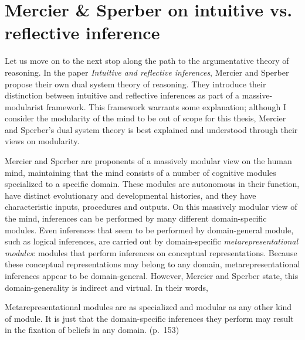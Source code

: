 
\section{Mercier \& Sperber on intuitive vs. reflective inference}
\label{sec:MS09}


Let us move on to the next stop along the path to the argumentative theory of reasoning. In the \citeyear{MS09} paper \emph{Intuitive and reflective inferences}, Mercier and Sperber propose their own dual system theory of reasoning. They introduce their distinction between intuitive and reflective inferences as part of a massive-modularist framework. This framework warrants some explanation; although I consider the modularity of the mind to be out of scope for this thesis, Mercier and Sperber's dual system theory is best explained and understood through their views on modularity.

Mercier and Sperber are proponents of a massively modular view on the human mind, maintaining that the mind consists of a number of cognitive modules specialized to a specific domain. These modules are autonomous in their function, have distinct evolutionary and developmental histories, and they have characteristic inputs, procedures and outputs.
On this massively modular view of the mind, inferences can be performed by many different domain-specific modules. Even inferences that seem to be performed by domain-general module, such as logical inferences, are carried out by domain-specific \emph{metarepresentational modules}: modules that perform inferences on conceptual representations.
Because these conceptual representations may belong to any domain, metarepresentational inferences appear to be domain-general. However, Mercier and Sperber state, this domain-generality is indirect and virtual. In their words,
\begin{quoting}
    Metarepresentational modules are as specialized and modular as any other kind of module. It is just that the domain-specific inferences they perform may result in the fixation of beliefs in any domain.
    \hfill (p.~153)
\end{quoting}

